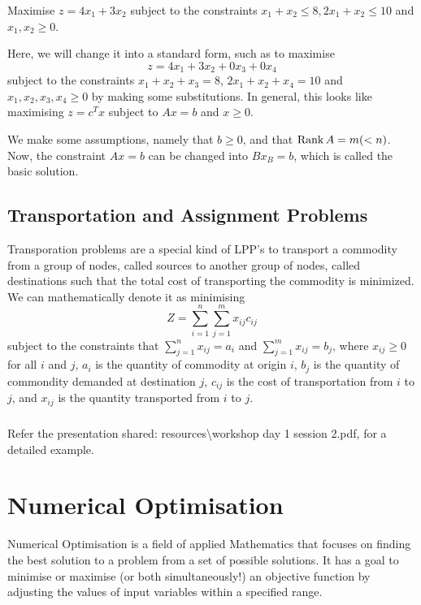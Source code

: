 \begin{question}
	Maximise $z=4x_1 + 3x_2$ subject to the constraints $x_1 + x_2 \le 8, 2x_1 + x_2 \le 10$ and $x_1, x_2 \ge 0$.
\end{question}
\begin{solution}
	Here, we will change it into a standard form, such as to maximise
	$$z = 4x_1 + 3x_2 + 0x_3 + 0x_4$$
	subject to the constraints
	$x_1 + x_2 + x_3 = 8$, $2x_1 + x_2 + x_4 = 10$ and $x_1, x_2, x_3, x_4 \ge 0$ by making some substitutions. In general, this looks like maximising $z = c^Tx$ subject to $Ax=b$ and $x\ge 0$.
\end{solution}

We make some assumptions, namely that
$b \ge 0$, and that $\operatorname{Rank} A = m (<n)$.
Now, the constraint $Ax=b$ can be changed into $B x_B = b$, which is called the basic solution.

\section{Transportation and Assignment Problems}

Transporation problems are a special kind of LPP's to transport a commodity from  a group of nodes, called sources to another
group of nodes, called destinations such that the
total cost of transporting the commodity is
minimized. We can mathematically denote it as minimising
	$$Z = \sum_{i = 1}^n \sum_{j = 1}^m x_{ij} c_{ij}$$
	subject to the constraints that $\sum_{j = 1}^n  x_{ij} = a_i$ and $\sum_{j = 1}^m x_{ij} = b_j$, where
	$x_{ij} \ge 0$ for all $i$ and $j$, $a_i$ is the quantity of commodity at origin $i$, $b_j$ is the quantity of commondity demanded at destination $j$, $c_{ij}$ is the cost of transportation from $i$ to $j$, and $x_{ij}$ is the quantity transported from $i$ to $j$.

\paragraph{}
Refer the presentation shared: {\ttfamily resources{\textbackslash}workshop day 1 session 2.pdf}, for a detailed example.

\chapter{Numerical Optimisation}
\myskip

Numerical Optimisation is a field of applied Mathematics that focuses on finding the best solution to a problem from a set of possible solutions. It has a goal to minimise or maximise (or both simultaneously!) an objective function by adjusting the values of input variables within a specified range. 

